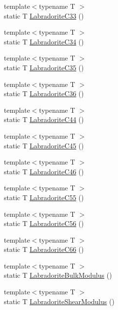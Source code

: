 \begin{DoxyCompactItemize}
{\footnotesize template$<$typename T $>$ }\\static T \mbox{\hyperlink{namespacempc_1_1data_a441b677f9400c94cc1e402c199776576}{Labradorite\+C33}} ()
\item 
{\footnotesize template$<$typename T $>$ }\\static T \mbox{\hyperlink{namespacempc_1_1data_aab7321917ad0dc7ba5c6091a4145e902}{Labradorite\+C34}} ()
\item 
{\footnotesize template$<$typename T $>$ }\\static T \mbox{\hyperlink{namespacempc_1_1data_a9f2c1af322f673b8ef0b8e294329962c}{Labradorite\+C35}} ()
\item 
{\footnotesize template$<$typename T $>$ }\\static T \mbox{\hyperlink{namespacempc_1_1data_a9c1b33c104dec4353af014a027e75725}{Labradorite\+C36}} ()
\item 
{\footnotesize template$<$typename T $>$ }\\static T \mbox{\hyperlink{namespacempc_1_1data_a2afe18008935a4c20161553bada047a9}{Labradorite\+C44}} ()
\item 
{\footnotesize template$<$typename T $>$ }\\static T \mbox{\hyperlink{namespacempc_1_1data_a48b4cfc6ba1ed9d206522e9d43f30ac6}{Labradorite\+C45}} ()
\item 
{\footnotesize template$<$typename T $>$ }\\static T \mbox{\hyperlink{namespacempc_1_1data_a5f2b3c336a7eb64940b49463cce37c11}{Labradorite\+C46}} ()
\item 
{\footnotesize template$<$typename T $>$ }\\static T \mbox{\hyperlink{namespacempc_1_1data_af0b90b3ba262d7ea9d975b1b8bceb02e}{Labradorite\+C55}} ()
\item 
{\footnotesize template$<$typename T $>$ }\\static T \mbox{\hyperlink{namespacempc_1_1data_a6378cd9512d26cc3ab606cd86188ba8c}{Labradorite\+C56}} ()
\item 
{\footnotesize template$<$typename T $>$ }\\static T \mbox{\hyperlink{namespacempc_1_1data_a087218da37a0b89a353d6301d142bc42}{Labradorite\+C66}} ()
\item 
{\footnotesize template$<$typename T $>$ }\\static T \mbox{\hyperlink{namespacempc_1_1data_a14d2fd8625be3776965380686ab8b67d}{Labradorite\+Bulk\+Modulus}} ()
\item 
{\footnotesize template$<$typename T $>$ }\\static T \mbox{\hyperlink{namespacempc_1_1data_a0129edf78d76750f848b0d8e973528ef}{Labradorite\+Shear\+Modulus}} ()

\end{DoxyCompactItemize}
